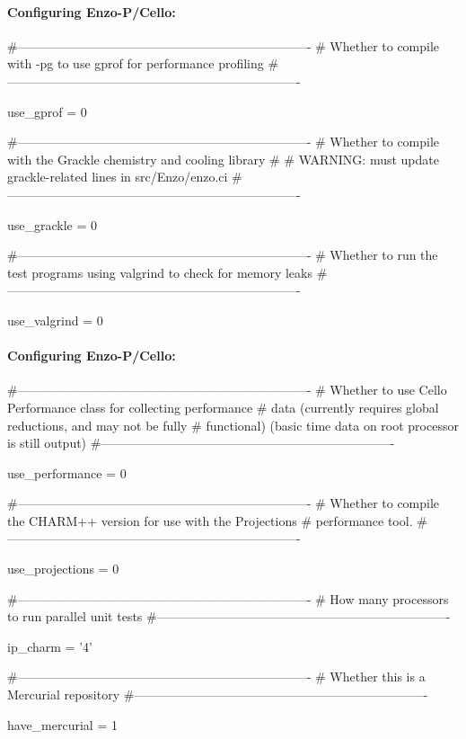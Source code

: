 \begin{frame}[fragile] 
\secframetitle{\ssConfigure}
\framesubtitle{Configuring Enzo-P/Cello: }
\tiny
\begin{semiverbatim}
#----------------------------------------------------------------------
# Whether to compile with -pg to use gprof for performance profiling
#----------------------------------------------------------------------

use_gprof = 0

#----------------------------------------------------------------------
# Whether to compile with the Grackle chemistry and cooling library
#
# WARNING: must update grackle-related lines in src/Enzo/enzo.ci
#----------------------------------------------------------------------

use_grackle = 0

#----------------------------------------------------------------------
# Whether to run the test programs using valgrind to check for memory leaks
#----------------------------------------------------------------------

use_valgrind = 0

\end{semiverbatim}
\end{frame}

\begin{frame}[fragile] 
\secframetitle{\ssConfigure}
\framesubtitle{Configuring Enzo-P/Cello: }
\tiny
\begin{semiverbatim}
#----------------------------------------------------------------------
# Whether to use Cello Performance class for collecting performance
# data (currently requires global reductions, and may not be fully
# functional) (basic time data on root processor is still output)
#----------------------------------------------------------------------

use_performance = 0

#----------------------------------------------------------------------
# Whether to compile the CHARM++ version for use with the Projections
# performance tool.
#----------------------------------------------------------------------

use_projections = 0

#----------------------------------------------------------------------
# How many processors to run parallel unit tests
#----------------------------------------------------------------------

ip_charm = '4'

#----------------------------------------------------------------------
# Whether this is a Mercurial repository
#----------------------------------------------------------------------

have_mercurial = 1
\end{semiverbatim}
\end{frame}

